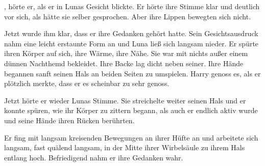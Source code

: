 , hörte er, als er in Lunas Gesicht blickte. Er hörte ihre Stimme klar und deutlich vor sich, als hätte sie selber gesprochen. Aber ihre Lippen bewegten sich nicht.

Jetzt wurde ihm klar, dass er ihre Gedanken gehört hatte. Sein Gesichtsausdruck nahm eine leicht erstaunte Form an und Luna ließ sich langsam nieder. Er spürte ihren Körper auf sich, ihre Wärme, ihre Nähe. Sie war mit nichts außer einem dünnen Nachthemd bekleidet. Ihre Backe lag dicht neben seiner. Ihre Hände begannen sanft seinen Hals an beiden Seiten zu umspielen. Harry genoss es, als er plötzlich merkte, dass er es scheinbar zu sehr genoss.

Jetzt hörte er wieder Lunas Stimme.  Sie streichelte weiter seinen Hals und er konnte spüren, wie ihr Körper zu zittern begann, als auch er endlich aktiv wurde und seine Hände ihren Rücken berührten.

Er fing mit langsam kreisenden Bewegungen an ihrer Hüfte an und arbeitete sich langsam, fast quälend langsam, in der Mitte ihrer Wirbelsäule zu ihrem Hals entlang hoch. Befriedigend nahm er ihre Gedanken wahr.

